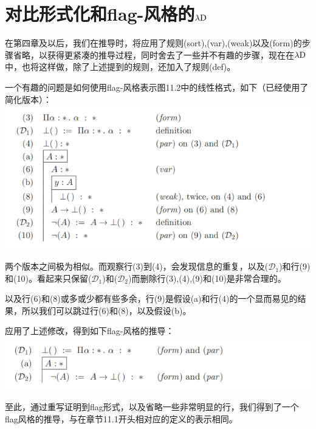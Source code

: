 \documentclass[UTF8]{article}
\begin{document}
	\section{对比形式化和flag-风格的$\lambda{\rm D}$}
	\noindent
	在第四章及以后，我们在推导时，将应用了规则(sort),(var),(weak)以及(form)的步骤省略，以获得更紧凑的推导过程，同时舍去了一些并不有趣的步骤，现在在$\lambda{\rm D}$中，也将这样做，除了上述提到的规则，还加入了规则(def)。
	
		一个有趣的问题是如何使用flag-风格表示图11.2中的线性格式，如下（已经使用了简化版本）：\\
		\includegraphics[width=0.93\linewidth]{"../imgs/11-2.png"}
		
		两个版本之间极为相似。而观察行(3)到(4)，会发现信息的重复，以及($\mathcal{D}_1$)和行(9)和(10)。看起来只保留($\mathcal{D}_1$)和($\mathcal{D}_2$)而删除行(3),(4),(9)和(10)是非常合理的。
		
		以及行(6)和(8)或多或少都有些多余，行(9)是假设(a)和行(4)的一个显而易见的结果，所以我们可以跳过行(6)和(8)，以及假设(b)。
		
		应用了上述修改，得到如下flag-风格的推导：\\
		\includegraphics[width=0.93\linewidth]{"../imgs/11-3.png"}
		
		至此，通过重写证明到flag形式，以及省略一些非常明显的行，我们得到了一个flag风格的推导，与在章节11.1开头相对应的定义的表示相同。
\end{document}
